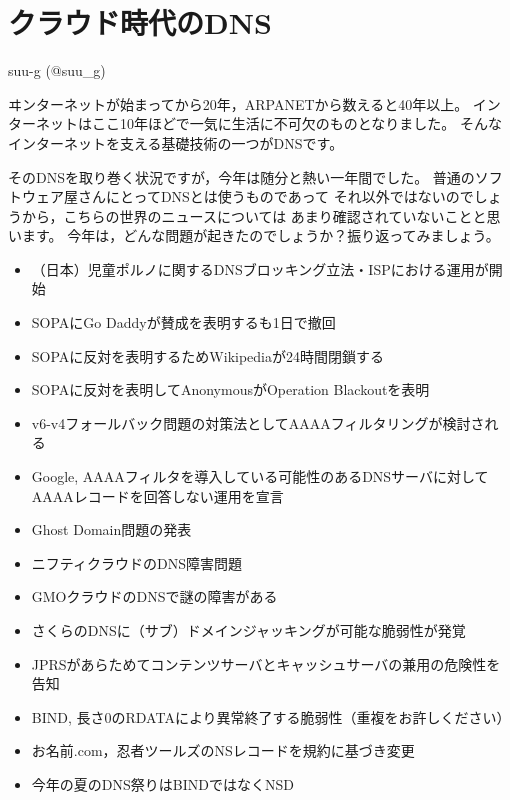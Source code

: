 
\cleardoublepage
\plainifnotempty

\chapter{クラウド時代のDNS}
\begin{flushright}
suu-g (@suu\_g)
\end{flushright}

\lettrine{ヰ}
ンターネットが始まってから20年，ARPANETから数えると40年以上。
インターネットはここ10年ほどで一気に生活に不可欠のものとなりました。
そんなインターネットを支える基礎技術の一つがDNSです。

そのDNSを取り巻く状況ですが，今年は随分と熱い一年間でした。
普通のソフトウェア屋さんにとってDNSとは使うものであって
それ以外ではないのでしょうから，こちらの世界のニュースについては
あまり確認されていないことと思います。
今年は，どんな問題が起きたのでしょうか？振り返ってみましょう。
\begin{itemize}
  \item （日本）児童ポルノに関するDNSブロッキング立法・ISPにおける運用が開始
  \item SOPAにGo Daddyが賛成を表明するも1日で撤回
  \item SOPAに反対を表明するためWikipediaが24時間閉鎖する
  \item SOPAに反対を表明してAnonymousがOperation Blackoutを表明
  \item v6-v4フォールバック問題の対策法としてAAAAフィルタリングが検討される
  \item Google, AAAAフィルタを導入している可能性のあるDNSサーバに対してAAAAレコードを回答しない運用を宣言
  \item Ghost Domain問題の発表
  \item ニフティクラウドのDNS障害問題
  \item GMOクラウドのDNSで謎の障害がある
  \item さくらのDNSに（サブ）ドメインジャッキングが可能な脆弱性が発覚
  \item JPRSがあらためてコンテンツサーバとキャッシュサーバの兼用の危険性を告知
  \item BIND, 長さ0のRDATAにより異常終了する脆弱性（重複をお許しください）
  \item お名前.com，忍者ツールズのNSレコードを規約に基づき変更
  \item 今年の夏のDNS祭りはBINDではなくNSD
\end{itemize}

